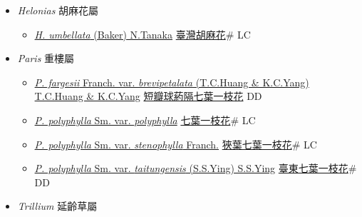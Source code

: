 
  \begin{itemize}
 \item[] \textit{Helonias} 胡麻花屬
                    
  \begin{itemize}
        \item[] \href{http://www.theplantlist.org/tpl1.1/search?q=Helonias+umbellata}{\textit{H. umbellata} (Baker) N.Tanaka}   \href{\detokenize{http://taibnet.sinica.edu.tw/chi/taibnet_species_list.php?T2=臺灣胡麻花&T2_new_value=true&fr=y}}{臺灣胡麻花}\# LC
  \end{itemize}
 \item[] \textit{Paris} 重樓屬
                    
  \begin{itemize}
        \item[] \href{http://www.theplantlist.org/tpl1.1/search?q=Paris+fargesii+var.+brevipetalata}{\textit{P. fargesii} Franch. var. \textit{brevipetalata} (T.C.Huang \& K.C.Yang) T.C.Huang \& K.C.Yang}   \href{\detokenize{http://taibnet.sinica.edu.tw/chi/taibnet_species_list.php?T2=短瓣球葯隔七葉一枝花&T2_new_value=true&fr=y}}{短瓣球葯隔七葉一枝花} DD
        \item[] \href{http://www.theplantlist.org/tpl1.1/search?q=Paris+polyphylla+var.+polyphylla}{\textit{P. polyphylla} Sm. var. \textit{polyphylla}}   \href{\detokenize{http://taibnet.sinica.edu.tw/chi/taibnet_species_list.php?T2=七葉一枝花&T2_new_value=true&fr=y}}{七葉一枝花}\# LC
        \item[] \href{http://www.theplantlist.org/tpl1.1/search?q=Paris+polyphylla+var.+stenophylla}{\textit{P. polyphylla} Sm. var. \textit{stenophylla} Franch.}   \href{\detokenize{http://taibnet.sinica.edu.tw/chi/taibnet_species_list.php?T2=狹葉七葉一枝花&T2_new_value=true&fr=y}}{狹葉七葉一枝花}\# LC
        \item[] \href{http://www.theplantlist.org/tpl1.1/search?q=Paris+polyphylla+var.+taitungensis}{\textit{P. polyphylla} Sm. var. \textit{taitungensis} (S.S.Ying) S.S.Ying}   \href{\detokenize{http://taibnet.sinica.edu.tw/chi/taibnet_species_list.php?T2=臺東七葉一枝花&T2_new_value=true&fr=y}}{臺東七葉一枝花}\# DD
  \end{itemize}
 \item[] \textit{Trillium} 延齡草屬
                    

\end{itemize}

